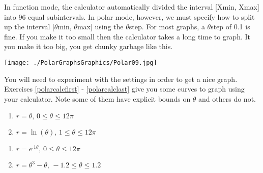 \documentclass{ximera}
\begin{document}
In function mode, the calculator automatically divided the interval [Xmin, Xmax] into 96 equal subintervals.  In polar mode, however, we must specify how to split up the interval [$\theta$min, $\theta$max] using the $\theta$step.  For most graphs, a $\theta$step of 0.1 is fine.  If you make it too small then the calculator takes a long time to graph.  It you make it too big, you get chunky garbage like this.

\begin{center}

\texttt{[image: ./PolarGraphsGraphics/Polar09.jpg]} 

\end{center}

You will need to experiment with the settings in order to get a nice graph.  Exercises \ref{polarcalcfirst} - \ref{polarcalclast} give you some curves to graph using your calculator.  Note some of them have explicit bounds on $\theta$ and others do not.

\begin{multicols}{2}

\begin{enumerate}

\setcounter{enumi}{\value{HW}}

\item $r = \theta, \, 0 \leq \theta \leq 12\pi$ \label{polarcalcfirst}
\item $r = \ln(\theta), \, 1 \leq \theta \leq 12\pi$

\setcounter{HW}{\value{enumi}}

\end{enumerate}

\end{multicols}

\begin{multicols}{2} 

\begin{enumerate}

\setcounter{enumi}{\value{HW}}

\item $r = e^{.1\theta}, \, 0 \leq \theta \leq 12\pi$
\item $r = \theta^{3} - \theta, \, -1.2 \leq \theta \leq 1.2$

\setcounter{HW}{\value{enumi}}

\end{enumerate}

\end{multicols}
\end{document}
